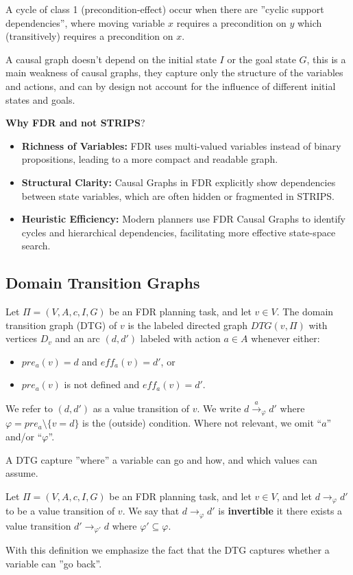 \documentclass[10pt, letterpaper]{report}
\begin{document}
 A cycle of class 1 (precondition-effect) occur when there
 are ''cyclic support dependencies'', where moving variable $x$ requires a
 precondition on $y$ which (transitively) requires a precondition on $x$.\bigskip 

 A causal graph doesn't depend on the initial state $I$ or the goal state $G$, this is a main weakness of causal graphs, they capture only the
 structure of the variables and actions, and can by design not account for
 the influence of different initial states and goals.\bigskip 

 \noindent\textbf{Why FDR and not STRIPS}?
 \begin{itemize}
    \item \textbf{Richness of Variables:} FDR uses multi-valued variables instead of binary propositions, leading to a more compact and readable graph.
    \item \textbf{Structural Clarity:} Causal Graphs in FDR explicitly show dependencies between state variables, which are often hidden or fragmented in STRIPS.
    \item \textbf{Heuristic Efficiency:} Modern planners use FDR Causal Graphs to identify cycles and hierarchical dependencies, facilitating more effective state-space search.
\end{itemize}
\subsection{Domain Transition Graphs}
\begin{definition}[DTG]
    Let $\Pi = (V, A, c, I, G)$ be an FDR planning task, and let $v \in V$. The domain transition graph (DTG) of $v$ is the labeled directed graph $DTG(v, \Pi)$ with vertices $D_v$ and an arc $(d, d')$ labeled with action $a \in A$ whenever either:
\begin{itemize}
    \item[(i)] $pre_a(v) = d$ and $eff_a(v) = d'$, or 
    \item[(ii)] $pre_a(v)$ is not defined and $eff_a(v) = d'$.
\end{itemize}\end{definition}
We refer to $(d, d')$ as a value transition of $v$. We write $d \xrightarrow{a}_{\varphi} d'$ where $\varphi = pre_a \setminus \{v = d\}$ is the (outside) condition. Where not relevant, we omit ``$a$'' and/or ``$\varphi$''.

A DTG capture ''where'' a variable can go and how, and which values can assume.
\begin{definition}
    Let $\Pi = (V, A, c, I, G)$ be an FDR planning task, and let $v \in V$, and let $d \rightarrow_{\varphi} d'$ to be a value transition of $v$. We say that $d \rightarrow_{\varphi} d'$ is \textbf{invertible} it there exists a value transition  $d' \rightarrow_{\varphi'} d$ where $\varphi'\subseteq\varphi$.
\end{definition}
With this definition we emphasize the fact that the DTG captures whether a variable can ''go back''.
\end{document}
